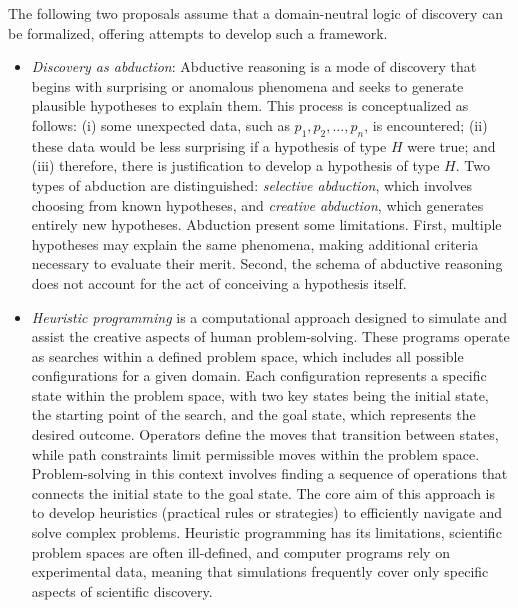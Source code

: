 The following two proposals assume that a domain-neutral logic of discovery can be formalized, offering attempts to develop such a framework.

\begin{itemize}

\item \emph{Discovery as abduction}: Abductive reasoning is a mode of discovery that begins with surprising or anomalous phenomena and seeks to generate plausible hypotheses to explain them. This process is conceptualized as follows: (i) some unexpected data, such as $p_1, p_2, \ldots, p_n$, is encountered; (ii) these data would be less surprising if a hypothesis of type $H$ were true; and (iii) therefore, there is justification to develop a hypothesis of type $H$. Two types of abduction are distinguished: \emph{selective abduction}, which involves choosing from known hypotheses, and \emph{creative abduction}, which generates entirely new hypotheses. Abduction present some limitations. First, multiple hypotheses may explain the same phenomena, making additional criteria necessary to evaluate their merit. Second, the schema of abductive reasoning does not account for the act of conceiving a hypothesis itself.

\item \emph{Heuristic programming} is a computational approach designed to simulate and assist the creative aspects of human problem-solving. These programs operate as searches within a defined problem space, which includes all possible configurations for a given domain. Each configuration represents a specific state within the problem space, with two key states being the initial state, the starting point of the search, and the goal state, which represents the desired outcome. Operators define the moves that transition between states, while path constraints limit permissible moves within the problem space. Problem-solving in this context involves finding a sequence of operations that connects the initial state to the goal state. The core aim of this approach is to develop heuristics (practical rules or strategies) to efficiently navigate and solve complex problems. Heuristic programming has its limitations, scientific problem spaces are often ill-defined, and computer programs rely on experimental data, meaning that simulations frequently cover only specific aspects of scientific discovery.

\end{itemize}


